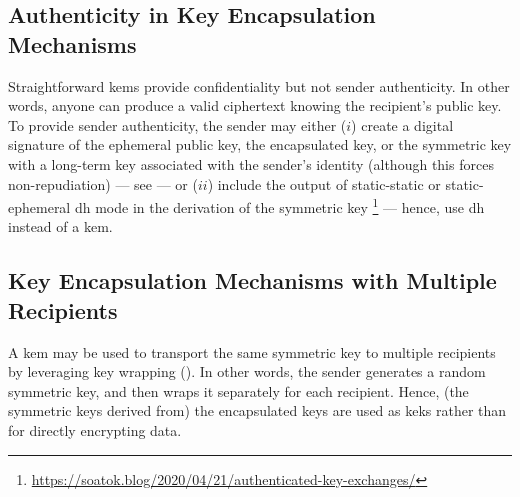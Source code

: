 

\subsection{Authenticity in Key Encapsulation Mechanisms}\label{sec:key_encapsulation_mechanisms:authenticity}

Straightforward \glspl{kem} provide confidentiality but not sender authenticity. In other words, anyone can produce a valid ciphertext knowing the recipient's public key. To provide sender authenticity, the sender may either ($i$) create a digital signature of the ephemeral public key, the encapsulated key, or the symmetric key with a long-term key associated with the sender's identity (although this forces non-repudiation) --- see  --- or ($ii$) include the output of static-static or static-ephemeral \gls{dh} mode in the derivation of the symmetric key \footnote{\url{https://soatok.blog/2020/04/21/authenticated-key-exchanges/}} --- hence, use \gls{dh} instead of a \gls{kem}.


\subsection{Key Encapsulation Mechanisms with Multiple Recipients}\label{sec:key_encapsulation_mechanisms:multiple}

A \gls{kem} may be used to transport the same symmetric key to multiple recipients by leveraging key wrapping (). In other words, the sender generates a random symmetric key, and then wraps it separately for each recipient. Hence, (the symmetric keys derived from) the encapsulated keys are used as \glspl{kek} rather than for directly encrypting data.

